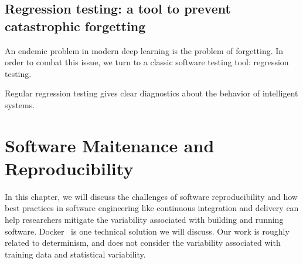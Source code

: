 \documentclass[12pt,initial,twoside,maitrise]{dms}
\numberwithin{equation}{section}
\numberwithin{table}{chapter}
\numberwithin{figure}{chapter}
\begin{document}
%
%
%
%
%
%
%
%
%
%

\section{Regression testing: a tool to prevent catastrophic forgetting}

An endemic problem in modern deep learning is the problem of forgetting. In order to combat this issue, we turn to a classic software testing tool: regression testing.

Regular regression testing gives clear diagnostics about the behavior of intelligent systems.

\chapter{Software Maitenance and Reproducibility}\label{ch:software-reproducibility}

In this chapter, we will discuss the challenges of software reproducibility and how best practices in software engineering like continuous integration and delivery can help researchers mitigate the variability associated with building and running software. Docker~\cite{merkel2014docker} is one technical solution we will discuss. Our work is roughly related to determinism, and does not consider the variability associated with training data and statistical variability.
\end{document}
